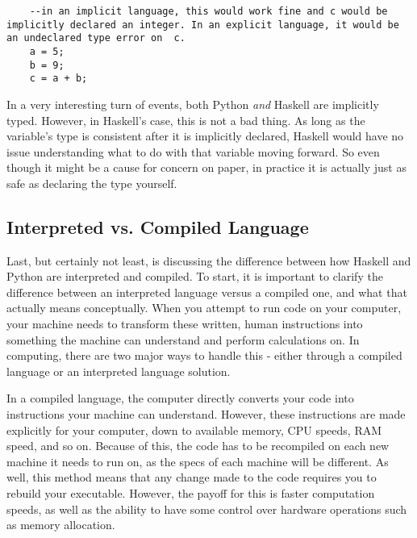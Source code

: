 \documentclass{article}
\begin{document}
    \begin{lstlisting}
    --in an implicit language, this would work fine and c would be implicitly declared an integer. In an explicit language, it would be an undeclared type error on  c. 
    a = 5;
    b = 9;
    c = a + b;
    \end{lstlisting}
    
    \medskip\noindent In a very interesting turn of events, both Python \textit{and} Haskell are implicitly typed. However, in Haskell's case, this is not a bad thing. As long as the variable's type is consistent after it is implicitly declared, Haskell would have no issue understanding what to do with that variable moving forward. So even though it might be a cause for concern on paper, in practice it is actually just as safe as declaring the type yourself.  

    \subsection{Interpreted vs. Compiled Language}
    Last, but certainly not least, is discussing the difference between how Haskell and Python are interpreted and compiled. To start, it is important to clarify the difference between an interpreted language versus a compiled one, and what that actually means conceptually. When you attempt to run code on your computer, your machine needs to transform these written, human instructions into something the machine can understand and perform calculations on. In computing, there are two major ways to handle this - either through a compiled language or an interpreted language solution. 
    
    \medskip\noindent In a compiled language, the computer directly converts your code into instructions your machine can understand. However, these instructions are made explicitly for your computer, down to available memory, CPU speeds, RAM speed, and so on. Because of this, the code has to be recompiled on each new machine it needs to run on, as the specs of each machine will be different. As well, this method means that any change made to the code requires you to rebuild your executable. However, the payoff for this is faster computation speeds, as well as the ability to have some control over hardware operations such as memory allocation. 
    
\end{document}
